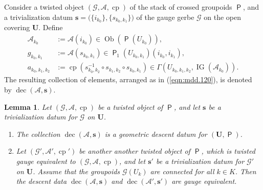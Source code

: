 \documentclass[a4paper, 10pt]{amsart}
\newtheorem{lem}[equation]{Lemma}
\theoremstyle{definition}
\numberwithin{equation}{section}
\newcommand{\opn}{\operatorname}
\newcommand{\cat}[1]{\operatorname{\mathsf{#1}}}
\newcommand{\mcal}[1]{\mathcal{#1}}
\newcommand{\bsym}[1]{\boldsymbol{#1}}
\newcommand{\gerbe}[1]{\bsym{\mcal{#1}}}
\newcommand{\twocat}[1]{\operatorname{\bsym{\cat{#1}}}}
\begin{document}
Consider a twisted object
$(\gerbe{G}, \gerbe{A}, \opn{cp})$
of the stack of crossed groupoids $\twocat{P}$, 
and a trivialization datum 
$\bsym{s} = \bigl( \{ i_{k_0} \} , \{ s_{k_0, k_1} \} \bigr)$ 
of the gauge gerbe $\gerbe{G}$ on the open covering $\bsym{U}$. Define 
\begin{equation}
\begin{aligned}
\mcal{A}_{k_0} & := \gerbe{A}(i_{k_0}) \in \opn{Ob}(\twocat{P}(U_{k_0})) , 
\\
g_{k_0, k_1} & := \gerbe{A}(s_{k_0, k_1}) \in 
\twocat{P}_1(U_{k_0, k_1})(i_{k_0}, i_{k_1}) , 
\\
a_{k_0, k_1, k_2} & := \opn{cp} ( s_{k_0, k_2}^{-1} \circ s_{k_1, k_2} \circ
s_{k_0, k_1} ) \in \Gamma(U_{k_0, k_1, k_2}, \opn{IG}(\mcal{A}_{k_0})) . 
\end{aligned}
\end{equation}
The resulting collection of elements, arranged as in (\ref{eqn:mdd.120}),
is denoted by $\opn{dec}(\gerbe{A}, \bsym{s})$.

\begin{lem}   \label{lem:bitorsors.2}
Let $(\gerbe{G}, \gerbe{A}, \opn{cp})$ be a twisted object of $\twocat{P}$,
and let $\bsym{s}$ be a trivialization datum for $\gerbe{G}$ on $\bsym{U}$.
\begin{enumerate}
\item The collection $\opn{dec}(\gerbe{A}, \bsym{s})$ is a geometric descent
datum for $(\bsym{U}, \twocat{P})$. 

\item Let $(\gerbe{G}', \gerbe{A}', \opn{cp}')$ be another another twisted
object of $\twocat{P}$, which is twisted gauge equivalent to 
$(\gerbe{G}, \gerbe{A}, \opn{cp})$, 
and let $\bsym{s}'$ be a trivialization datum for $\gerbe{G}'$ on $\bsym{U}$.
Assume that the groupoids 
$\gerbe{G}(U_k)$ are connected for all $k \in K$. Then 
the descent data $\opn{dec}(\gerbe{A}, \bsym{s})$ and 
$\opn{dec}(\gerbe{A}', \bsym{s}')$ are gauge equivalent.
\end{enumerate}
\end{lem}
\end{document}
